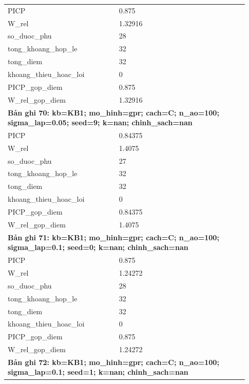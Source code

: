 \begin{longtable}{p{0.43\linewidth}p{0.50\linewidth}}
PICP & 0.875 \\
W\_\allowbreak rel & 1.32916 \\
so\_\allowbreak duoc\_\allowbreak phu & 28 \\
tong\_\allowbreak khoang\_\allowbreak hop\_\allowbreak le & 32 \\
tong\_\allowbreak diem & 32 \\
khoang\_\allowbreak thieu\_\allowbreak hoac\_\allowbreak loi & 0 \\
PICP\_\allowbreak gop\_\allowbreak diem & 0.875 \\
W\_\allowbreak rel\_\allowbreak gop\_\allowbreak diem & 1.32916 \\
\midrule
\multicolumn{2}{p{0.95\linewidth}}{\textbf{Bản ghi 70: kb=KB1; mo\_hinh=gpr; cach=C; n\_ao=100; sigma\_lap=0.05; seed=9; k=nan; chinh\_sach=nan}} \\
PICP & 0.84375 \\
W\_\allowbreak rel & 1.4075 \\
so\_\allowbreak duoc\_\allowbreak phu & 27 \\
tong\_\allowbreak khoang\_\allowbreak hop\_\allowbreak le & 32 \\
tong\_\allowbreak diem & 32 \\
khoang\_\allowbreak thieu\_\allowbreak hoac\_\allowbreak loi & 0 \\
PICP\_\allowbreak gop\_\allowbreak diem & 0.84375 \\
W\_\allowbreak rel\_\allowbreak gop\_\allowbreak diem & 1.4075 \\
\midrule
\multicolumn{2}{p{0.95\linewidth}}{\textbf{Bản ghi 71: kb=KB1; mo\_hinh=gpr; cach=C; n\_ao=100; sigma\_lap=0.1; seed=0; k=nan; chinh\_sach=nan}} \\
PICP & 0.875 \\
W\_\allowbreak rel & 1.24272 \\
so\_\allowbreak duoc\_\allowbreak phu & 28 \\
tong\_\allowbreak khoang\_\allowbreak hop\_\allowbreak le & 32 \\
tong\_\allowbreak diem & 32 \\
khoang\_\allowbreak thieu\_\allowbreak hoac\_\allowbreak loi & 0 \\
PICP\_\allowbreak gop\_\allowbreak diem & 0.875 \\
W\_\allowbreak rel\_\allowbreak gop\_\allowbreak diem & 1.24272 \\
\midrule
\multicolumn{2}{p{0.95\linewidth}}{\textbf{Bản ghi 72: kb=KB1; mo\_hinh=gpr; cach=C; n\_ao=100; sigma\_lap=0.1; seed=1; k=nan; chinh\_sach=nan}} \\

\end{longtable}
